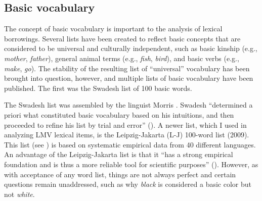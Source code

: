 \documentclass[output=paper]{LSP/langsci}
\begin{document}
\subsection{Basic vocabulary}

	The concept of basic vocabulary is important to the analysis of lexical borrowings. Several lists have been created to reflect basic concepts that are considered to be universal and culturally independent, such as basic kinship (e.g., \emph{mother}, \emph{father}), general animal terms (e.g., \emph{fish}, \emph{bird}), and basic verbs (e.g., \emph{make}, \emph{go}). The stability of the resulting list of “universal” vocabulary has been brought into question, however, and multiple lists of basic vocabulary have been published. The first was the Swadesh list of 100 basic words.

	The Swadesh list was assembled by the linguist Morris \citet{Swadesh1971}. Swadesh “determined a priori what constituted basic vocabulary based on his intuitions, and then proceeded to refine his list by trial and error” (\citealt[230]{Tadmoretal2010}). A newer list, which I used in analyzing LMV lexical items, is the Leipzig-Jakarta (L-J) 100-word list (2009). This list (see ) is based on systematic empirical data from 40 different languages. An advantage of the Leipzig-Jakarta list is that it ``has a strong empirical foundation and is thus a more reliable tool for scientific purposes” (\citealt[230]{Tadmor2010}). However, as with acceptance of any word list, things are not always perfect and certain questions remain unaddressed, such as why \emph{black} is considered a basic color but not \emph{white}.
\end{document}
